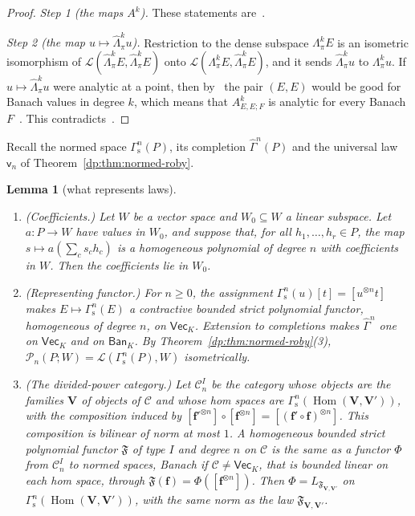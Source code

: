 \documentclass[11pt]{amsart}
\newtheorem{lemma}[theorem]{Lemma}
\theoremstyle{definition}
\theoremstyle{remark}
\numberwithin{equation}{section}
\newcommand{\cL}{\mathcal L}
\newcommand{\cC}{\mathcal{C}}
\theoremstyle{plain}
\theoremstyle{definition}
\theoremstyle{plain}
\newcommand{\hLambda}{\widehat\Lambda}
\newcommand{\hGamma}{\widehat\Gamma}
\newcommand{\cP}{\mathcal P}
\begin{document}
\begin{proof}
\emph{Step 1 (the maps $A^k$).} These statements are~\cite[Theorem~7.2]{I}.

\emph{Step 2 (the map $u\mapsto\hLambda^k_\pi u$).} Restriction to the dense subspace $\Lambda^k_\pi E$ is an isometric isomorphism of $\cL(\hLambda^k_\pi E,\hLambda^k_\pi E)$ onto $\cL(\Lambda^k_\pi E,\hLambda^k_\pi E)$, and it sends $\hLambda^k_\pi u$ to $\Lambda^k_\pi u$. If $u\mapsto\hLambda^k_\pi u$ were analytic at a point, then by~\cite[Lemma~3.4]{I} the pair $(E,E)$ would be good for Banach values in degree $k$, which means that $A^k_{E,E;F}$ is analytic for every Banach $F$~\cite[Definition~3.3]{I}. This contradicts~\cite[Theorem~7.2(1)]{I}.
\end{proof}

Recall the normed space $\Gamma^n_{\mathrm s}(P)$, its completion $\hGamma^n(P)$ and the universal law $\mathsf v_n$ of Theorem~\ref{dp:thm:normed-roby}.

\begin{lemma}[what represents laws]\label{dp:lem:functor-rep}
\leavevmode
\begin{enumerate}
\item \textup{(Coefficients.)} Let $W$ be a vector space and $W_0\subseteq W$ a linear subspace. Let $a\colon P\to W$ have values in $W_0$, and suppose that, for all $h_1,\dots,h_r\in P$, the map $s\mapsto a(\sum_cs_ch_c)$ is a homogeneous polynomial of degree $n$ with coefficients in $W$. Then the coefficients lie in $W_0$.
\item \textup{(Representing functor.)} For $n\ge0$, the assignment $\Gamma^n_{\mathrm s}(u)[t]=[u^{\otimes n}t]$ makes $E\mapsto\Gamma^n_{\mathrm s}(E)$ a contractive bounded strict polynomial functor, homogeneous of degree $n$, on $\mathsf{Vec}_K$. Extension to completions makes $\hGamma^n$ one on $\mathsf{Vec}_K$ and on $\mathsf{Ban}_K$. By Theorem~\ref{dp:thm:normed-roby}(3), $\cP_n(P;W)=\cL(\Gamma^n_{\mathrm s}(P),W)$ isometrically.
\item \textup{(The divided-power category.)} Let $\cC^I_n$ be the category whose objects are the families $\mathbf V$ of objects of $\cC$ and whose hom spaces are $\Gamma^n_{\mathrm s}(\operatorname{Hom}(\mathbf V,\mathbf V'))$, with the composition induced by $[\mathbf f'^{\otimes n}]\circ[\mathbf f^{\otimes n}]=[(\mathbf f'\circ\mathbf f)^{\otimes n}]$. This composition is bilinear of norm at most $1$. A homogeneous bounded strict polynomial functor $\mathfrak F$ of type $I$ and degree $n$ on $\cC$ is the same as a functor $\Phi$ from $\cC^I_n$ to normed spaces, Banach if $\cC\ne\mathsf{Vec}_K$, that is bounded linear on each hom space, through $\mathfrak F(\mathbf f)=\Phi([\mathbf f^{\otimes n}])$. Then $\Phi=L_{\mathfrak F_{\mathbf V,\mathbf V'}}$ on $\Gamma^n_{\mathrm s}(\operatorname{Hom}(\mathbf V,\mathbf V'))$, with the same norm as the law $\mathfrak F_{\mathbf V,\mathbf V'}$.
\end{enumerate}
\end{lemma}
\end{document}
